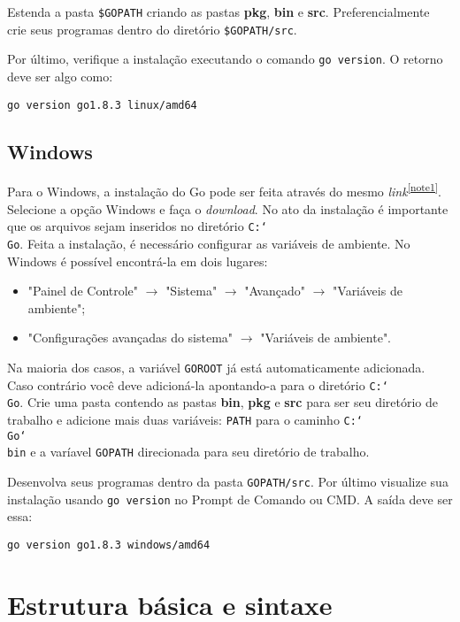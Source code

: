 \documentclass{SBCbookchapter}
\begin{document}
Estenda a pasta \texttt{\$GOPATH} criando as pastas \textbf{pkg}, \textbf{bin} e \textbf{src}. Preferencialmente crie seus programas dentro do diretório \texttt{\$GOPATH/src}.

Por último, verifique a instalação executando o comando \texttt{go version}. O retorno deve ser algo como:

\noindent\texttt{go version go1.8.3 linux/amd64}


\subsection{Windows}

Para o Windows, a instalação do Go pode ser feita através do mesmo \textit{link}\textsuperscript{\ref{note1}}. Selecione a opção Windows e faça o \textit{download}. No ato da instalação é importante que os arquivos sejam inseridos no diretório \texttt{C:\char`\\Go}. Feita a instalação, é necessário configurar as variáveis de ambiente. No Windows é possível encontrá-la em dois lugares:

\begin{itemize}
	\item "Painel de Controle" $\rightarrow$ "Sistema" $\rightarrow$ "Avançado" $\rightarrow$ "Variáveis de ambiente";
	\item "Configurações avançadas do sistema" $\rightarrow$ "Variáveis de ambiente".
\end{itemize}

Na maioria dos casos, a variável \texttt{GOROOT} já está automaticamente adicionada. Caso contrário você deve adicioná-la apontando-a para o diretório \texttt{C:\char`\\Go}. Crie uma pasta contendo as pastas \textbf{bin}, \textbf{pkg} e \textbf{src} para ser seu diretório de trabalho e adicione mais duas variáveis: \texttt{PATH} para o caminho \texttt{C:\char`\\Go\char`\\bin} e a varíavel \texttt{GOPATH} direcionada para seu diretório de trabalho.

Desenvolva seus programas dentro da pasta \texttt{GOPATH/src}. Por último visualize sua instalação usando \texttt{go version} no Prompt de Comando ou CMD. A saída deve ser essa:

\noindent\texttt{go version go1.8.3 windows/amd64}


\section{Estrutura básica e sintaxe}
\end{document}
